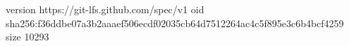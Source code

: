version https://git-lfs.github.com/spec/v1
oid sha256:f36ddbe07a3b2aaaef506ecdf02035cb64d7512264ac4c5f895e3c6b4bcf4259
size 10293
